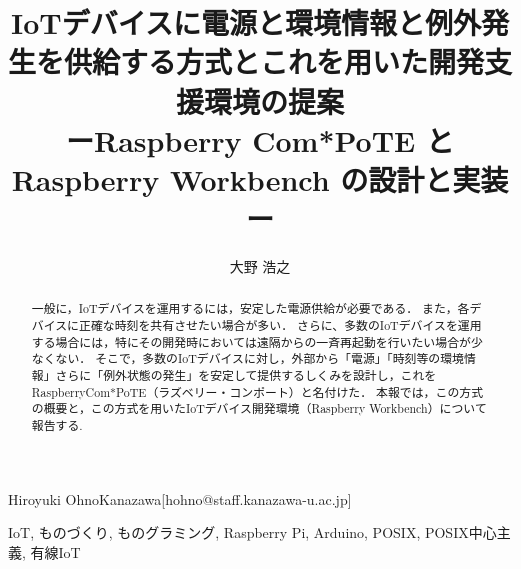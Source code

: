 \title{
  IoTデバイスに電源と環境情報と例外発生を供給する方式とこれを用いた開発支援環境の提案\\
  ーRaspberry Com*PoTE と Raspberry Workbench の設計と実装ー
}



\author{大野 浩之}{Hiroyuki Ohno}{Kanazawa}[hohno@staff.kanazawa-u.ac.jp]


\begin{abstract}
 一般に，IoTデバイスを運用するには，安定した電源供給が必要である．
 また，各デバイスに正確な時刻を共有させたい場合が多い．
 さらに、多数のIoTデバイスを運用する場合には，特にその開発時においては遠隔からの一斉再起動を行いたい場合が少なくない．
 そこで，多数のIoTデバイスに対し，外部から「電源」「時刻等の環境情報」さらに「例外状態の発生」を安定して提供するしくみを設計し，これを RaspberryCom*PoTE（ラズベリー・コンポート）と名付けた．
 本報では，この方式の概要と，この方式を用いたIoTデバイス開発環境（Raspberry Workbench）について報告する.

\end{abstract}

\begin{jkeyword}
IoT, ものづくり, ものグラミング, Raspberry Pi, Arduino, POSIX, POSIX中心主義, 有線IoT
\end{jkeyword}


